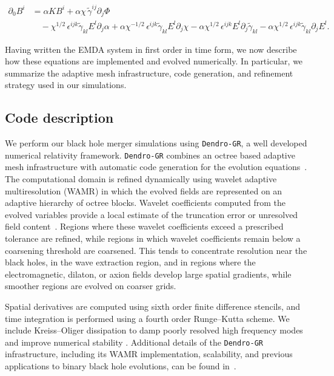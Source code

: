 \begin{equation}
\begin{aligned}
\partial_0 B^i
&= \alpha K B^i
+ \alpha \chi\, \tilde{\gamma}^{ij} \partial_j \Phi
\\[6pt]
&\quad
- \chi^{1/2}\, \epsilon^{ijk}\tilde{\gamma}_{kl} E^l \partial_j \alpha
+ \alpha \chi^{-1/2}\, \epsilon^{ijk}\tilde{\gamma}_{kl} E^l \partial_j \chi
- \alpha \chi^{1/2}\, \epsilon^{ijk} E^l \partial_j \tilde{\gamma}_{kl}
- \alpha \chi^{1/2}\, \epsilon^{ijk}\tilde{\gamma}_{kl} \partial_j E^l .
\label{eq:emda_last}
\end{aligned}
\end{equation}

Having written the EMDA system in first order in time form, we now describe how these equations are implemented and evolved numerically. In particular, we summarize the adaptive mesh infrastructure, code generation, and refinement strategy used in our simulations.


\subsection{Code description}
\label{sec:code_description}

We perform our black hole merger simulations using \texttt{Dendro-GR}, a well developed numerical relativity framework. \texttt{Dendro-GR} combines an octree based adaptive
mesh infrastructure with automatic code generation for the evolution
equations~\cite{Fernando2019,Fernando2019b,Fernando2023}. The computational domain is refined dynamically using wavelet adaptive multiresolution (WAMR) in which the evolved fields are represented on an adaptive hierarchy of octree blocks. Wavelet coefficients computed from the evolved variables provide a local estimate of the truncation error 
or unresolved field content~\cite{DeBuhr2018RelativisticHydroWavelets,Anderson2006RelativisticMHDAMR, Fernando2023}.
Regions where these wavelet coefficients exceed a prescribed tolerance are refined, while regions in which wavelet coefficients remain below a coarsening threshold are coarsened. This tends to concentrate resolution near the black holes, in the wave extraction region, and in regions where the electromagnetic, dilaton, or axion fields develop large spatial gradients, while smoother regions are evolved on coarser grids.

Spatial derivatives are computed using sixth order finite difference
stencils, and time integration is performed using a fourth order
Runge--Kutta scheme. We include Kreiss--Oliger dissipation to damp
poorly resolved high frequency modes and improve numerical stability
\cite{KreissOliger1973}. Additional details of the \texttt{Dendro-GR}
infrastructure, including its WAMR implementation, scalability, and previous applications to binary black hole evolutions, can be
found in~\cite{Fernando2019,Fernando2019b,Fernando2023,Black2025_ORBIT}.


